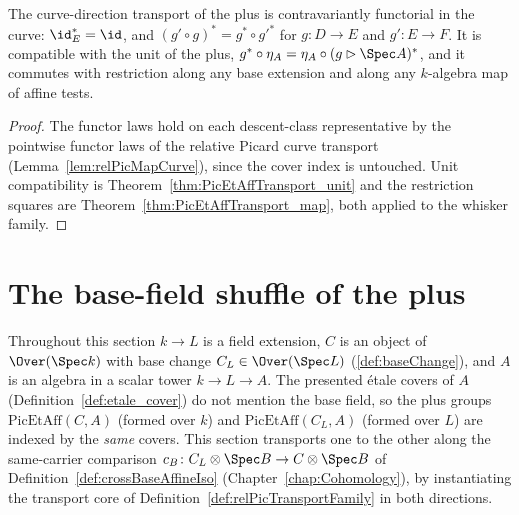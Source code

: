 \begin{theorem}
  \label{thm:PicEtAff_curveMap_laws}
  \leanok
  The curve-direction transport of the plus is contravariantly functorial in the curve:
  \(\id_E^{*} = \id\), and \((g' \circ g)^{*} = g^{*} \circ g'^{*}\) for
  \(g \colon D \to E\) and \(g' \colon E \to F\). It is compatible with the unit of the
  plus, \(g^{*} \circ \eta_A = \eta_A \circ (g \rhd \Spec A)^{*}\), and it commutes with
  restriction along any base extension and along any \(k\)-algebra map of affine tests.
\end{theorem}
\begin{proof}
  \leanok
  The functor laws hold on each descent-class representative by the pointwise functor laws
  of the relative Picard curve transport (Lemma~\ref{lem:relPicMapCurve}), since the cover
  index is untouched. Unit compatibility is Theorem~\ref{thm:PicEtAffTransport_unit} and
  the restriction squares are Theorem~\ref{thm:PicEtAffTransport_map}, both applied to the
  whisker family.
\end{proof}

\section{The base-field shuffle of the plus}
\label{sec:PicEtAffBaseFieldShuffle}

Throughout this section \(k \to L\) is a field extension, \(C\) is an object of
\(\Over(\Spec k)\) with base change \(C_L \in \Over(\Spec L)\) (\ref{def:baseChange}),
and \(A\) is an algebra in a scalar tower \(k \to L \to A\). The presented \'etale
covers of \(A\) (Definition~\ref{def:etale_cover}) do not mention the base field, so the
plus groups \(\mathrm{PicEtAff}(C, A)\) (formed over \(k\)) and
\(\mathrm{PicEtAff}(C_L, A)\) (formed over \(L\)) are indexed by the \emph{same} covers.
This section transports one to the other along the same-carrier comparison
\(c_B \colon C_L \otimes \Spec B \to C \otimes \Spec B\) of
Definition~\ref{def:crossBaseAffineIso} (Chapter~\ref{chap:Cohomology}), by
instantiating the transport core of Definition~\ref{def:relPicTransportFamily} in both
directions.

